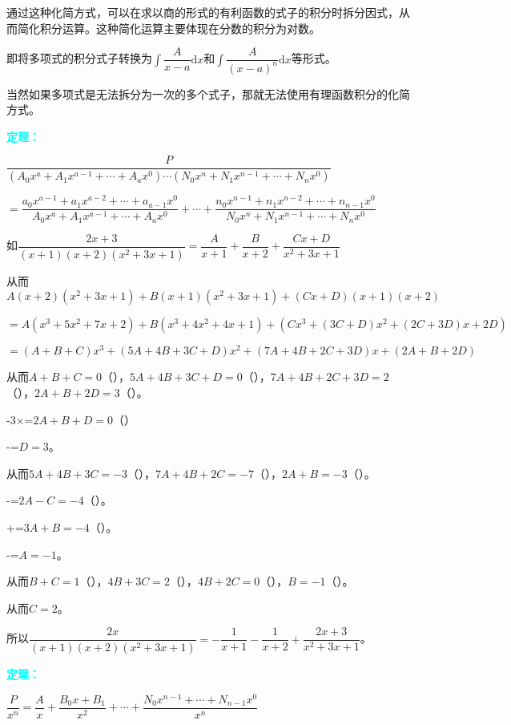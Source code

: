 \documentclass[UTF8, 12pt]{ctexart}
\begin{document}
通过这种化简方式，可以在求以商的形式的有利函数的式子的积分时拆分因式，从而简化积分运算。这种简化运算主要体现在分数的积分为对数。

即将多项式的积分式子转换为$\displaystyle{\int\dfrac{A}{x-a}\textrm{d}x}$和$\displaystyle{\int\dfrac{A}{(x-a)^n}\textrm{d}x}$等形式。

当然如果多项式是无法拆分为一次的多个式子，那就无法使用有理函数积分的化简方式。

\textcolor{aqua}{\textbf{定理：}}

$\dfrac{P}{(A_0x^a+A_1x^{a-1}+\cdots+A_ax^0)\cdots(N_0x^n+N_1x^{n-1}+\cdots+N_nx^0)}$ \medskip

$=\dfrac{a_0x^{a-1}+a_1x^{a-2}+\cdots+a_{a-1}x^0}{A_0x^a+A_1x^{a-1}+\cdots+A_ax^0}+\cdots+\dfrac{n_0x^{n-1}+n_1x^{n-2}+\cdots+n_{n-1}x^0}{N_0x^n+N_1x^{n-1}+\cdots+N_nx^0}$ \medskip

如$\dfrac{2x+3}{(x+1)(x+2)(x^2+3x+1)}=\dfrac{A}{x+1}+\dfrac{B}{x+2}+\dfrac{Cx+D}{x^2+3x+1}$ \medskip

从而$A(x+2)(x^2+3x+1)+B(x+1)(x^2+3x+1)+(Cx+D)(x+1)(x+2)$

$=A(x^3+5x^2+7x+2)+B(x^3+4x^2+4x+1)+(Cx^3+(3C+D)x^2+(2C+3D)x+2D)$

$=(A+B+C)x^3+(5A+4B+3C+D)x^2+(7A+4B+2C+3D)x+(2A+B+2D)$

从而$A+B+C=0$（），$5A+4B+3C+D=0$（），$7A+4B+2C+3D=2$（），$2A+B+2D=3$（）。

-3×=$2A+B+D=0$（）

-=$D=3$。

从而$5A+4B+3C=-3$（），$7A+4B+2C=-7$（），$2A+B=-3$（）。

-=$2A-C=-4$（）。

+=$3A+B=-4$（）。

-=$A=-1$。

从而$B+C=1$（），$4B+3C=2$（），$4B+2C=0$（），$B=-1$（）。

从而$C=2$。

所以$\dfrac{2x}{(x+1)(x+2)(x^2+3x+1)}=-\dfrac{1}{x+1}-\dfrac{1}{x+2}+\dfrac{2x+3}{x^2+3x+1}$。\medskip

\textcolor{aqua}{\textbf{定理：}}

$\dfrac{P}{x^n}=\dfrac{A}{x}+\dfrac{B_0x+B_1}{x^2}+\cdots+\dfrac{N_0x^{n-1}+\cdots+N_{n-1}x^0}{x^n}$ \medskip
\end{document}

